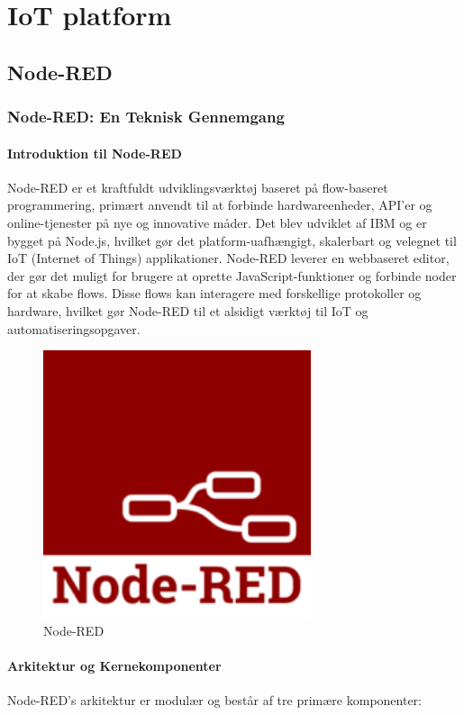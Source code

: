 \part{IoT platform}
\chapter{Node-RED}
\section{Node-RED: En Teknisk Gennemgang}
\subsection{Introduktion til Node-RED}
Node-RED er et kraftfuldt udviklingsværktøj baseret på flow-baseret programmering, primært anvendt til at forbinde hardwareenheder, API'er og online-tjenester på nye og innovative måder. Det blev udviklet af IBM og er bygget på Node.js, hvilket gør det platform-uafhængigt, skalerbart og velegnet til IoT (Internet of Things) applikationer. Node-RED leverer en webbaseret editor, der gør det muligt for brugere at oprette JavaScript-funktioner og forbinde noder for at skabe flows. Disse flows kan interagere med forskellige protokoller og hardware, hvilket gør Node-RED til et alsidigt værktøj til IoT og automatiseringsopgaver. 

\begin{figure}[h!]
	\centering
	\includegraphics[width=0.7\textwidth]{fig/fig26.png} %
	\caption{Node-RED}
\end{figure}

\subsection{Arkitektur og Kernekomponenter}
Node-RED's arkitektur er modulær og består af tre primære komponenter:


